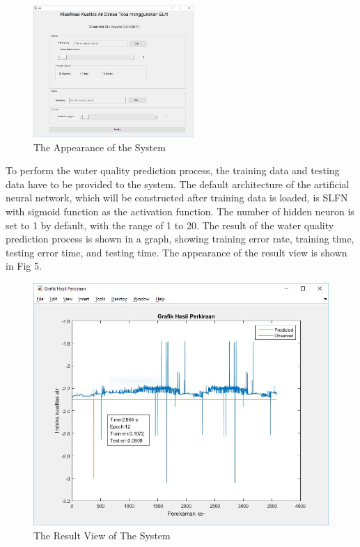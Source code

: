 \documentclass[journal,comsoc]{IEEEtran}
\let\MYoriglatexcaption\caption
\renewcommand{\caption}[2][\relax]{\MYoriglatexcaption[#2]{#2}}
\begin{document}

\begin{figure}[h!]
\centering
\includegraphics[width=0.8\columnwidth, height=50mm]{fig-4.jpg}
\caption{The Appearance of the System}
\label{fig4}
\end{figure}

To perform the water quality prediction process, the training data and testing data have to be provided to the system. The default architecture of the artificial neural network, which will be constructed after training data is loaded, is SLFN with sigmoid function as the activation function. The number of hidden neuron is set to 1 by default, with the range of 1 to 20. The result of the water quality prediction process is shown in a graph, showing training error rate, training time, testing error time, and testing time. The appearance of the result view is shown in Fig 5.

\begin{figure}[!th]
\centering
\includegraphics[scale=0.25]{fig-5.jpg}
\caption{The Result View of The System}
\label{fig5}
\end{figure}
\end{document}
